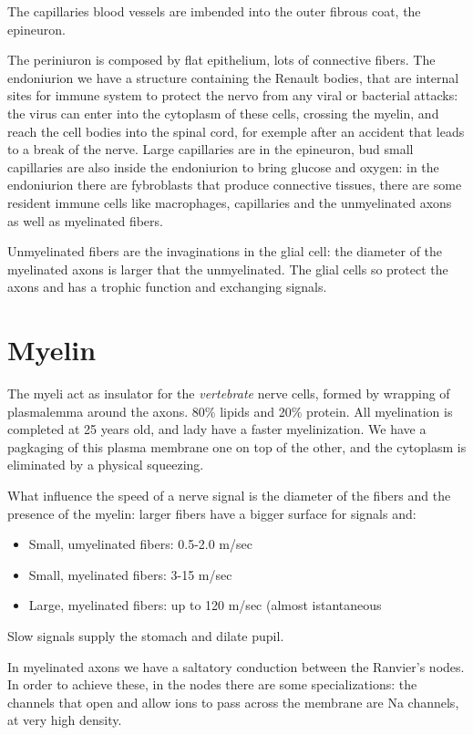 \documentclass[a4paper, 12pt]{book}
\begin{document}
The capillaries blood vessels are imbended into the outer fibrous coat, the epineuron. 

The periniuron is composed by flat epithelium, lots of connective fibers. The endoniurion we have a structure containing the Renault bodies, that are internal sites for immune system to protect the nervo from any viral or bacterial attacks: the virus can enter into the cytoplasm of these cells, crossing the myelin, and reach the cell bodies into the spinal cord, for exemple after an accident that leads to a break of the nerve.
Large capillaries are in the epineuron, bud small capillaries are also inside the endoniurion to bring glucose and oxygen: in the endoniurion there are fybroblasts that produce connective tissues, there are some resident immune cells like macrophages, capillaries and the unmyelinated axons as well as myelinated fibers.

Unmyelinated fibers are the invaginations in the glial cell: the diameter of the myelinated axons is larger that the unmyelinated. The glial cells so protect the axons and has a trophic function and exchanging signals.

\section{Myelin}
The myeli act as insulator for the \emph{vertebrate} nerve cells, formed by wrapping of plasmalemma around the axons. 80\% lipids and 20\% protein. All myelination is completed at 25 years old, and lady have a faster myelinization. We have a pagkaging of this plasma membrane one on top of the other, and the cytoplasm is eliminated by a physical squeezing. 

What influence the speed of a nerve signal is the diameter of the fibers and the presence of the myelin: larger fibers have a bigger surface for signals and:
\begin{itemize}
\item{Small, umyelinated fibers: 0.5-2.0 m/sec}
\item{Small, myelinated fibers: 3-15 m/sec}
\item{Large, myelinated fibers: up to 120 m/sec (almost istantaneous}
\end{itemize}

Slow signals supply the stomach and dilate pupil.

In myelinated axons we have a saltatory conduction between the Ranvier's nodes. In order to achieve these, in the nodes there are some specializations: the channels that open and allow ions to pass across the membrane are Na channels, at very high density.
\end{document}
